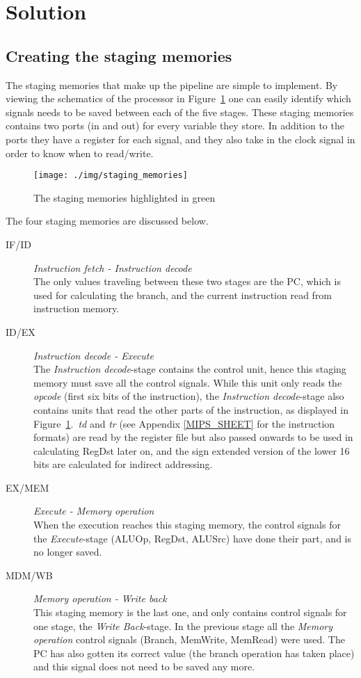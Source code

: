 \section{Solution}
\subsection{Creating the staging memories}
\label{sub:creating_the_staging_memories}
The staging memories that make up the pipeline are simple to implement. By viewing the schematics of the processor in Figure~\ref{img:staging_memories} one can easily identify which signals needs to be saved between each of the five stages. These staging memories contains two ports (in and out) for every variable they store. In addition to the ports they have a register for each signal, and they also take in the clock signal in order to know when to read/write.\\

\begin{figure}[H]
	\centering
	\texttt{[image: ./img/staging\_memories]}
	\caption{The staging memories highlighted in green}
	\label{img:staging_memories}
\end{figure}

The four staging memories are discussed below.
\begin{description}
	\item [IF/ID] \emph{Instruction fetch - Instruction decode}\\
The only values traveling between these two stages are the PC, which is used for calculating the branch, and the current instruction read from instruction memory.
	\item [ID/EX] \emph{Instruction decode - Execute} \\
The \emph{Instruction decode}-stage contains the control unit, hence this staging memory must save all the control signals. While this unit only reads the \emph{opcode} (first six bits of the instruction), the \emph{Instruction decode}-stage also contains units that read the other parts of the instruction, as displayed in Figure~\ref{img:staging_memories}.~\emph{td} and \emph{tr} (see Appendix \ref{MIPS_SHEET} for the instruction formats) are read by the register file but also passed onwards to be used in calculating RegDst later on, and the sign extended version of the lower 16 bits are calculated for indirect addressing.
	\item [EX/MEM] \emph{Execute - Memory operation}\\
When the execution reaches this staging memory, the control signals for the \emph{Execute}-stage (ALUOp, RegDst, ALUSrc) have done their part, and is no longer saved.
	\item[MDM/WB] \emph{Memory operation - Write back}\\
This staging memory is the last one, and only contains control signals for one stage, the \emph{Write Back}-stage. In the previous stage all the \emph{Memory operation} control signals (Branch, MemWrite, MemRead) were used. The PC has also gotten its correct value (the branch operation has taken place) and this signal does not need to be saved any more.
\end{description}

